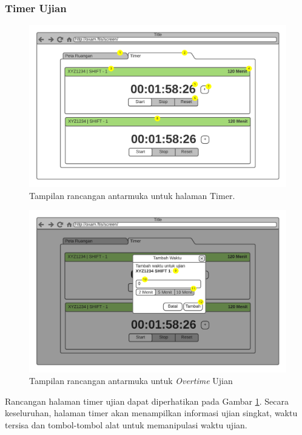 \subsubsection{Timer Ujian}
    \begin{figure}
        \centering
        \includegraphics[width=0.75\paperwidth]{Gambar/mockups/Mockup--DosenPengawas - Timer.pdf}
        \caption{Tampilan rancangan antarmuka untuk halaman Timer.}
        \label{fig:mockup_dosen_timer}
    \end{figure}
    
    \begin{figure}
        \centering
        \includegraphics[width=0.75\paperwidth]{Gambar/mockups/Mockup--DosenPengawas - Timer + Overtime.pdf}
        \caption{Tampilan rancangan antarmuka untuk \textit{Overtime} Ujian}
        \label{fig:mockup_dosen_overtime}
    \end{figure}
    
    Rancangan halaman timer ujian dapat diperhatikan pada Gambar \ref{fig:mockup_dosen_timer}.
    Secara keseluruhan, halaman timer akan menampilkan informasi ujian singkat, waktu tersisa
    dan tombol-tombol alat untuk memanipulasi waktu ujian.
    
